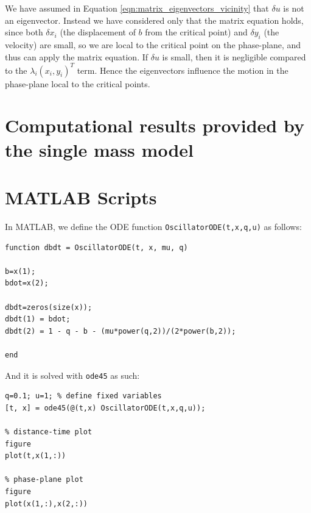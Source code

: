 \documentclass{article}
\begin{document}
We have assumed in Equation \ref{eqn:matrix_eigenvectors_vicinity} that $\delta u$ is not an eigenvector.
Instead we have considered only that the matrix equation holds,
since both $\delta x_i$ (the displacement of $b$ from the critical point)
and $\delta y_i$ (the velocity) are small, so we are local to the critical point on the phase-plane,
and thus can apply the matrix equation. If $\delta u$ is small, then it is negligible compared to the $\lambda_i (x_i,y_i)^T$ term.
Hence the eigenvectors influence the motion in the phase-plane local to the critical points. 

\section{Computational results provided by the single mass model}














\appendix

\section{MATLAB Scripts}

In MATLAB, we define the ODE function \texttt{OscillatorODE(t,x,q,u)} as follows:


\begin{verbatim}
function dbdt = OscillatorODE(t, x, mu, q)

b=x(1);
bdot=x(2);

dbdt=zeros(size(x));
dbdt(1) = bdot;
dbdt(2) = 1 - q - b - (mu*power(q,2))/(2*power(b,2));

end
\end{verbatim}

And it is solved with \texttt{ode45} as such:

\begin{verbatim}
q=0.1; u=1; % define fixed variables
[t, x] = ode45(@(t,x) OscillatorODE(t,x,q,u));

% distance-time plot
figure
plot(t,x(1,:))

% phase-plane plot
figure
plot(x(1,:),x(2,:))
\end{verbatim}
\end{document}

